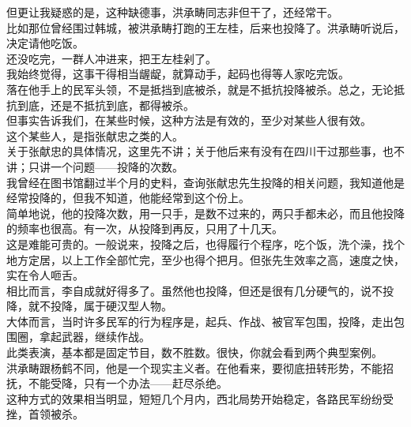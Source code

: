 \begin{multicols}{\theparacolNo}
但更让我疑惑的是，这种缺德事，洪承畴同志非但干了，还经常干。\\

比如那位曾经围过韩城，被洪承畴打跑的王左桂，后来也投降了。洪承畴听说后，决定请他吃饭。\\

还没吃完，一群人冲进来，把王左桂剁了。\\

我始终觉得，这事干得相当龌龊，就算动手，起码也得等人家吃完饭。\\

落在他手上的民军头领，不是抵挡到底被杀，就是不抵抗投降被杀。总之，无论抵抗到底，还是不抵抗到底，都得被杀。\\

但事实告诉我们，在某些时候，这种方法是有效的，至少对某些人很有效。\\

这个某些人，是指张献忠之类的人。\\

关于张献忠的具体情况，这里先不讲；关于他后来有没有在四川干过那些事，也不讲；只讲一个问题——投降的次数。\\

我曾经在图书馆翻过半个月的史料，查询张献忠先生投降的相关问题，我知道他是经常投降的，但我不知道，他能经常到这个份上。\\

简单地说，他的投降次数，用一只手，是数不过来的，两只手都未必，而且他投降的频率也很高。有一次，从投降到再反，只用了十几天。\\

这是难能可贵的。一般说来，投降之后，也得履行个程序，吃个饭，洗个澡，找个地方定居，以上工作全部忙完，至少也得个把月。但张先生效率之高，速度之快，实在令人咂舌。\\

相比而言，李自成就好得多了。虽然他也投降，但还是很有几分硬气的，说不投降，就不投降，属于硬汉型人物。\\

大体而言，当时许多民军的行为程序是，起兵、作战、被官军包围，投降，走出包围圈，拿起武器，继续作战。\\

此类表演，基本都是固定节目，数不胜数。很快，你就会看到两个典型案例。\\

洪承畴跟杨鹤不同，他是一个现实主义者。在他看来，要彻底扭转形势，不能招抚，不能受降，只有一个办法——赶尽杀绝。\\

这种方式的效果相当明显，短短几个月内，西北局势开始稳定，各路民军纷纷受挫，首领被杀。\\


\end{multicols}
